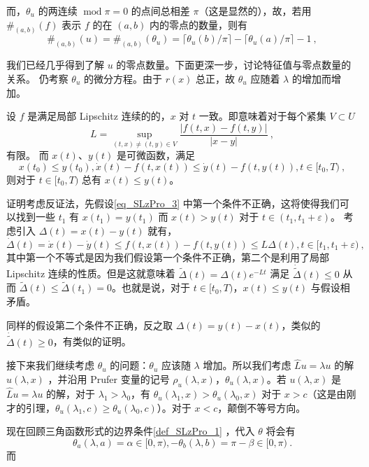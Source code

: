而，$\theta_u$ 的两连续 $\operatorname{mod} \pi = 0$ 的点间总相差 $\pi$（这是显然的），故，若用 $\#_{(a, b)}(f)$ 表示 $f$ 的在 $(a, b)$ 内的零点的数量，则有
\begin{equation}
\#_{(a, b)} (u) = \#_{(a, b)} (\theta_u) = \lceil \theta_u(b)/\pi \rceil - \lceil \theta_u(a)/\pi \rceil -1~,
\end{equation}

我们已经几乎得到了解 $u$ 的零点数量。下面更深一步，讨论特征值与零点数量的关系。
仍考察 $\theta_u$ 的微分方程。由于 $r(x)$ 总正，故 $\theta_u$ 应随着 $\lambda$ 的增加而增加。
\begin{lemma}{}
设 $f$ 是满足局部 Lipschitz 连续的的，$x$ 对 $t$ 一致。即意味着对于每个紧集 $V \subset U$
\begin{equation}
L = \sup_{(t, x) \neq (t, y) \in V} \frac{|f(t, x) - f(t, y)|}{|x-y|} ~,
\end{equation}
有限。
而 $x(t)$、$y(t)$ 是可微函数，满足
\begin{equation}\label{eq_SLzPro_3}
x(t_0) \le y(t_0), \dot x(t)-f(t, x (t)) \le \dot y(t) - f(t, y(t)), t \in [t_0, T) ~,
\end{equation}
则对于 $t \in [t_0, T)$ 总有 $x(t) \le y(t)$。
\end{lemma}
证明考虑反证法，先假设\autoref{eq_SLzPro_3} 中第一个条件不正确，这将使得我们可以找到一些 $t_1$ 有 $x(t_1) = y(t_1)$ 而 $x(t) > y(t)$ 对于 $t \in (t_1, t_1 + \varepsilon)$。 考虑引入 $\Delta(t) = x(t) - y(t)$ 就有，
\begin{equation}
\dot \Delta(t) = \dot x(t) - \dot y(t) \le f(t, x(t)) - f(t, y(t)) \le L\Delta(t), t \in [t_1, t_1 + \varepsilon) ~,
\end{equation}
其中第一个不等式是因为我们假设第一个条件不正确，第二个是利用了局部 Lipschitz 连续的性质。但是这就意味着 $\widetilde \Delta(t) = \Delta(t) e^{-Lt}$ 满足 $\dot{\widetilde \Delta}(t) \le 0$ 从而 $\widetilde \Delta(t)\le \widetilde \Delta(t_1) = 0$。也就是说，对于 $t \in[t_0, T)$，$x (t)\le y (t)$ 与假设相矛盾。

同样的假设第二个条件不正确，反之取 $\Delta(t) = y(t)-x(t)$，类似的 $\dot{\widetilde \Delta}(t) \ge 0$，有类似的证明。

接下来我们继续考虑 $\theta_u$ 的问题：$\theta_u$ 应该随 $\lambda$ 增加。所以我们考虑 $\hat Lu = \lambda u$ 的解 $u (\lambda, x)$ ，并沿用 Prufer 变量的记号 $\rho_u (\lambda, x)$，$\theta_u (\lambda, x)$。若 $u(\lambda, x)$ 是 $\hat Lu = \lambda u$ 的解，对于 $\lambda_1 > \lambda_0$，有 $\theta_u (\lambda_1, x) > \theta_u (\lambda_0, x)$ 对于 $x > c$（这是由刚才的引理，$\theta_u (\lambda_1, c)\ge \theta_u (\lambda_0,c)$）。对于 $x < c$，颠倒不等号方向。

现在回顾三角函数形式的边界条件\autoref{def_SLzPro_1} ，代入 $\theta$ 将会有
\begin{equation}
\theta_a(\lambda, a) = \alpha\in [0, \pi), -\theta_b(\lambda,  b) = \pi-\beta \in [0,\pi) ~.
\end{equation}
而